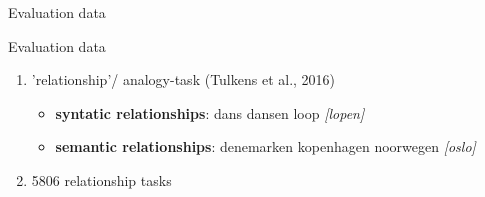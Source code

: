
\begin{frame}{Evaluation data}
  \begin{block}{Evaluation data}
    \begin{enumerate}
    \item 'relationship'/ analogy-task (Tulkens et al., 2016)
      \begin{itemize}
      \item \textbf{syntatic relationships}: dans dansen loop \textit{[lopen]}
      \item \textbf{semantic relationships}: denemarken kopenhagen noorwegen \textit{[oslo]}
      \end{itemize}
    \item 5806 relationship tasks
    \end{enumerate}
  \end{block}
\end{frame}


\begin{frame}{}
\end{frame}





\begin{frame}{}
\end{frame}


\begin{frame}{}
\end{frame}

